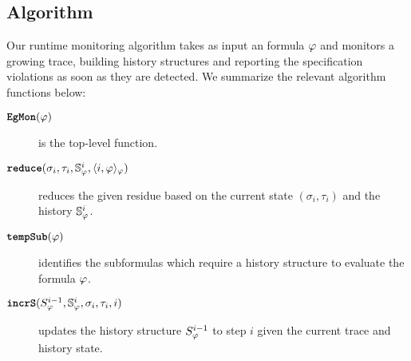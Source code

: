 



\subsection{\monitor Algorithm}
Our runtime monitoring algorithm \monitor takes as input an \planguage formula $\varphi$ and monitors a growing trace, building history structures and reporting the specification violations as soon as they are detected. We summarize the relevant algorithm functions below:

\begin{description}
\item[$\textbf{\texttt{EgMon}}{}(\varphi)$] is the top-level function.
\item[$\textbf{\texttt{reduce}}(\sigma_i, \tau_i, \mathbb{S}^{i}_{\varphi}, \langle i, \varphi \rangle_{\varphi})$] reduces the given residue based on the current state $(\sigma_i,\tau_i)$ and the history $\mathbb{S}^{i}_{\varphi}$.
\item[$\textbf{\texttt{tempSub}}(\varphi)$] identifies the subformulas which require a history structure to evaluate the formula $\varphi$.
\item[$\textbf{\texttt{incrS}}({S}^{i-1}_{\varphi}, \mathbb{S}^{i}_{\varphi}, \sigma_i, \tau_i, i)$] updates the history structure ${S}^{i-1}_{\varphi}$ to step $i$ given the current trace and history state.
\end{description}




